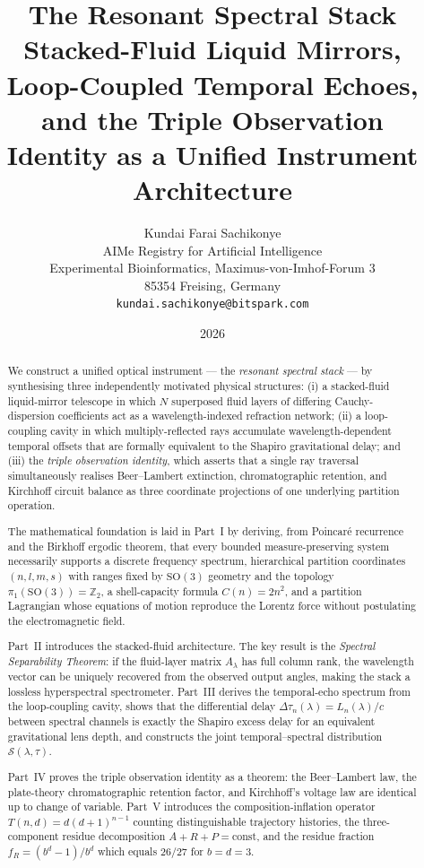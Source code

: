 \documentclass[11pt,twocolumn,a4paper]{article}
\title{\textbf{The Resonant Spectral Stack}\\[0.5em]
\large Stacked-Fluid Liquid Mirrors, Loop-Coupled Temporal Echoes,\\
and the Triple Observation Identity as a Unified Instrument Architecture}
\author{
Kundai Farai Sachikonye\\[0.3em]
AIMe Registry for Artificial Intelligence\\
Experimental Bioinformatics, Maximus-von-Imhof-Forum 3\\
85354 Freising, Germany\\
\texttt{kundai.sachikonye@bitspark.com}
}
\date{2026}
\theoremstyle{plain}
\theoremstyle{definition}
\theoremstyle{remark}
\begin{document}
\maketitle

\begin{abstract}
We construct a unified optical instrument — the \emph{resonant spectral stack} — by synthesising three independently motivated physical structures: (i) a stacked-fluid liquid-mirror telescope in which $N$ superposed fluid layers of differing Cauchy-dispersion coefficients act as a wavelength-indexed refraction network; (ii) a loop-coupling cavity in which multiply-reflected rays accumulate wavelength-dependent temporal offsets that are formally equivalent to the Shapiro gravitational delay; and (iii) the \emph{triple observation identity}, which asserts that a single ray traversal simultaneously realises Beer--Lambert extinction, chromatographic retention, and Kirchhoff circuit balance as three coordinate projections of one underlying partition operation.

The mathematical foundation is laid in Part~I by deriving, from Poincar\'{e} recurrence and the Birkhoff ergodic theorem, that every bounded measure-preserving system necessarily supports a discrete frequency spectrum, hierarchical partition coordinates $(n,l,m,s)$ with ranges fixed by $\mathrm{SO}(3)$ geometry and the topology $\pi_1(\mathrm{SO}(3))=\mathbb{Z}_2$, a shell-capacity formula $C(n)=2n^2$, and a partition Lagrangian whose equations of motion reproduce the Lorentz force without postulating the electromagnetic field.

Part~II introduces the stacked-fluid architecture. The key result is the \emph{Spectral Separability Theorem}: if the fluid-layer matrix $A_\lambda$ has full column rank, the wavelength vector can be uniquely recovered from the observed output angles, making the stack a lossless hyperspectral spectrometer. Part~III derives the temporal-echo spectrum from the loop-coupling cavity, shows that the differential delay $\Delta\tau_n(\lambda)=L_n(\lambda)/c$ between spectral channels is exactly the Shapiro excess delay for an equivalent gravitational lens depth, and constructs the joint temporal--spectral distribution $\mathcal{S}(\lambda,\tau)$.

Part~IV proves the triple observation identity as a theorem: the Beer--Lambert law, the plate-theory chromatographic retention factor, and Kirchhoff's voltage law are identical up to change of variable. Part~V introduces the composition-inflation operator $T(n,d)=d(d{+}1)^{n-1}$ counting distinguishable trajectory histories, the three-component residue decomposition $A+R+P=\text{const}$, and the residue fraction $f_R=(b^d-1)/b^d$ which equals $26/27$ for $b=d=3$.


\end{abstract}
\end{document}
